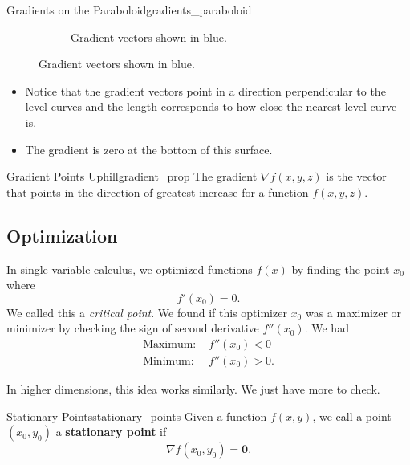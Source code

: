 \begin{ex}{Gradients on the Paraboloid}{gradients_paraboloid}
\begin{figure}[H]
\begin{subfigure}[h]{.45\textwidth}
                            \caption{Gradient vectors shown in blue.}
                            \end{subfigure}
                        \end{figure}
                        \begin{itemize}
                            \item Notice that the gradient vectors point in a direction perpendicular to the level curves and the length corresponds to how close the nearest level curve is.
                            \item The gradient is zero at the bottom of this surface.  
                        \end{itemize}
                        \end{ex}
                        
                        \begin{prop}{Gradient Points Uphill}{gradient_prop}
                        The gradient $\nabla f(x,y,z)$ is the vector that points in the direction of greatest increase for a function $f(x,y,z)$.
                        \end{prop}

\subsection{Optimization}
                        In single variable calculus, we optimized functions $f(x)$ by finding the point $x_0$ where 
                        \[
                        f'(x_0)=0.
                        \]
                        We called this a \emph{critical point}. We found if this optimizer $x_0$ was a maximizer or minimizer by checking the sign of second derivative $f''(x_0)$. We had
                        \begin{align*}
                            \textrm{Maximum: }& f''(x_0)<0\\
                            \textrm{Minimum: }& f''(x_0)>0.
                        \end{align*}
                        
                        In higher dimensions, this idea works similarly. We just have more to check. 
                        
                        \begin{df}{Stationary Points}{stationary_points}
                        Given a function $f(x,y)$, we call a point $(x_0,y_0)$ a \textbf{stationary point} if 
                        \[
                        \nabla f(x_0,y_0) = \mathbf{0}.
                        \]
                        \end{df}
                        
